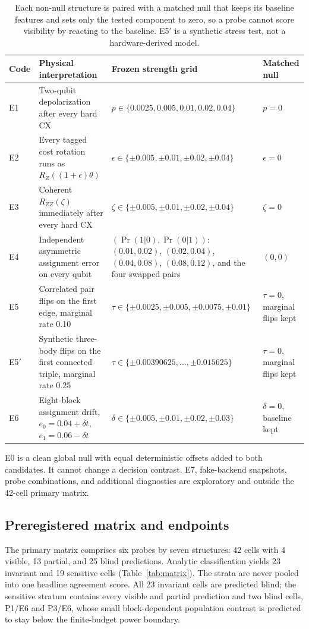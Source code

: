 \documentclass[10pt,twocolumn]{article}
\begin{document}
\begin{table}[t]
\centering
\caption{Each non-null structure is paired with a matched null that keeps its
baseline features and sets only the tested component to zero, so a probe
cannot score visibility by reacting to the baseline. E5$'$ is a synthetic
stress test, not a hardware-derived model.}
\label{tab:errors}
\begin{tabularx}{\textwidth}{@{}lXXl@{}}
\toprule
Code & Physical interpretation & Frozen strength grid & Matched null \\
\midrule
E1 & Two-qubit depolarization after every hard CX & $p\in\{0.0025,0.005,0.01,0.02,0.04\}$ & $p=0$ \\
E2 & Every tagged cost rotation runs as $R_Z((1+\epsilon)\theta)$ & $\epsilon\in\{\pm0.005,\pm0.01,\pm0.02,\pm0.04\}$ & $\epsilon=0$ \\
E3 & Coherent $R_{ZZ}(\zeta)$ immediately after every hard CX & $\zeta\in\{\pm0.005,\pm0.01,\pm0.02,\pm0.04\}$ & $\zeta=0$ \\
E4 & Independent asymmetric assignment error on every qubit & $(\Pr(1|0),\Pr(0|1))$: $(0.01,0.02)$, $(0.02,0.04)$, $(0.04,0.08)$, $(0.08,0.12)$, and the four swapped pairs & $(0,0)$ \\
E5 & Correlated pair flips on the first edge, marginal rate 0.10 & $\tau\in\{\pm0.0025,\pm0.005,\pm0.0075,\pm0.01\}$ & $\tau=0$, marginal flips kept \\
E5$'$ & Synthetic three-body flips on the first connected triple, marginal rate 0.25 & $\tau\in\{\pm0.00390625,\ldots,\pm0.015625\}$ & $\tau=0$, marginal flips kept \\
E6 & Eight-block assignment drift, $e_0=0.04+\delta t$, $e_1=0.06-\delta t$ & $\delta\in\{\pm0.005,\pm0.01,\pm0.02,\pm0.03\}$ & $\delta=0$, baseline kept \\
\bottomrule
\end{tabularx}
\end{table}

E0 is a clean global null with equal deterministic offsets added to both
candidates. It cannot change a decision contrast. E7, fake-backend snapshots,
probe combinations, and additional diagnostics are exploratory and outside the
42-cell primary matrix.

\subsection{Preregistered matrix and endpoints}

The primary matrix comprises six probes by seven structures: 42 cells with 4
visible, 13 partial, and 25 blind predictions. Analytic classification yields
23 invariant and 19 sensitive cells (Table~\ref{tab:matrix}). The strata are
never pooled into one headline agreement score. All 23 invariant cells are
predicted blind; the sensitive stratum contains every visible and partial
prediction and two blind cells, P1/E6 and P3/E6, whose small block-dependent
population contrast is predicted to stay below the finite-budget power
boundary.
\end{document}
